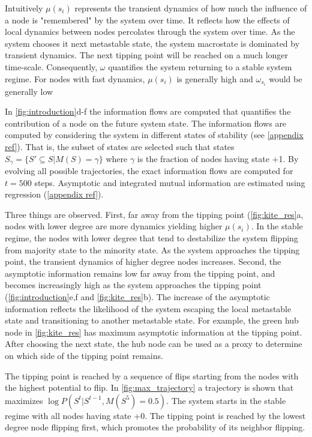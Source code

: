 \documentclass[a4paper, 11pt, twocolumn]{article}
\begin{document}
Intuitively $\mu(s_i)$ represents the transient dynamics of how much the influence of a node is "remembered" by the system over time. It reflects how the effects of local dynamics between nodes percolates through the system over time. As the system chooses it next metastable state, the system macrostate is dominated by transient dynamics. The next tipping point will be reached on a much longer time-scale. Consequently, $\omega$ quantifies the system returning to a stable system regime. For nodes with fast dynamics, $\mu(s_i)$ is generally high and $\omega_{s_i}$ would be generally low

In \cref{fig:introduction}d-f the information flows are computed that quantifies the contribution of a node on the future system state. The information flows are computed by considering the system in different states of stability (see \ref{appendix ref}). That is, the subset of states are selected such that states $S_{\gamma} = \{S' \subseteq S | M(S) = \gamma\}$ where $\gamma$ is the fraction of nodes having state +1. By evolving all possible trajectories, the exact information flows are computed for $t=500$ steps. Asymptotic and integrated mutual information are estimated using regression (\ref{appendix ref}).

Three things are observed. First, far away from the tipping point (\cref{fig:kite_res}a, nodes with lower degree are more dynamics yielding higher $\mu(s_i)$. In the stable regime, the nodes with lower degree that tend to destabilize the system flipping from majority state to the minority state. As the system approaches the tipping point, the transient dynamics of higher degree nodes increases. Second, the asymptotic information remains low far away from the tipping point, and becomes increasingly high as the system approaches the tipping point (\cref{fig:introduction}e,f and \cref{fig:kite_res}b). The increase of the asymptotic information reflects the likelihood of the system escaping the local metastable state and transitioning to another metastable state. For example, the green hub node in \cref{fig:kite_res} has maximum asymptotic information at the tipping point. After choosing the next state, the hub node can be used as a proxy to determine on which side of the tipping point remains.


The tipping point is reached by a sequence of flips starting from the nodes with the highest potential to flip. In \cref{fig:max_trajectory} a trajectory is shown that maximizes $\log P(S^t|S^{t-1}, M(S^5) = 0.5)$. The system starts in the stable regime with all nodes having state +0. The tipping point is reached by the lowest degree node flipping first, which promotes the probability of its neighbor flipping.
\end{document}
